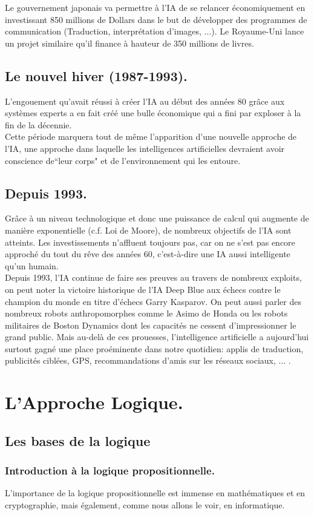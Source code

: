 \documentclass[a4paper, 12pt]{article}
\numberwithin{equation}{subsection}
\begin{document}
Le gouvernement japonais va permettre à l'IA de se relancer économiquement en investissant 850 millions de Dollars dans le but de développer des programmes de communication (Traduction, interprétation d'images, ...). Le Royaume-Uni lance un projet similaire qu'il finance à hauteur de 350 millions de livres.
\subsection{Le nouvel hiver (1987-1993).}
L'engouement qu'avait réussi à créer l'IA au début des années 80 grâce aux systèmes experts a en fait créé une bulle économique qui a fini par exploser à la fin de la décennie.\\
Cette période marquera tout de même l'apparition d'une nouvelle approche de l'IA, une approche dans laquelle les intelligences artificielles devraient avoir conscience de``leur corps" et de l'environnement qui les entoure.
\subsection{Depuis 1993.}
Grâce à un niveau technologique et donc une puissance de calcul qui augmente de manière exponentielle (c.f. Loi de Moore), de nombreux objectifs de l'IA sont atteints. Les investissements n'affluent toujours pas, car on ne s'est pas encore approché du tout du rêve des années 60, c'est-à-dire une IA aussi intelligente qu'un humain.\\

Depuis 1993, l'IA continue de faire ses preuves au travers de nombreux exploits, on peut noter la victoire historique de l'IA Deep Blue aux échecs contre le champion du monde en titre d'échecs Garry Kasparov. On peut aussi parler des nombreux robots anthropomorphes comme le Asimo de Honda ou les robots militaires de Boston Dynamics dont les capacités ne cessent d'impressionner le grand public. Mais au-delà de ces prouesses, l'intelligence artificielle a aujourd'hui surtout gagné une place proéminente dans notre quotidien: applis de traduction, publicités ciblées, GPS, recommandations d'amis sur les réseaux sociaux, ... .
\newpage
\section{L'Approche Logique.}
\subsection{Les bases de la logique}
  \subsubsection{Introduction à la logique propositionnelle.}
  L'importance de la logique propositionnelle est immense en mathématiques et en cryptographie, mais également, comme nous allons le voir, en informatique.\\
\end{document}
